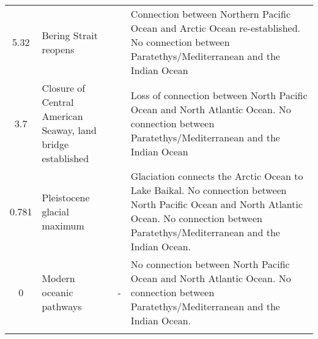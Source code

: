 \begin{longtable}{cp{}cp{}}
5.32 &
Bering Strait reopens &
\cite{gladenkov2002refined} &
Connection between Northern Pacific Ocean and Arctic Ocean re-established. No connection between Paratethys/Mediterranean and the Indian Ocean\\
3.7 &
Closure of Central American Seaway, land bridge established &
\cite{duque1990neogene} &
Loss of connection between North Pacific Ocean and North Atlantic Ocean. No connection between  Paratethys/Mediterranean and the Indian Ocean \\
0.781 &
Pleistocene glacial maximum &
\cite{ehlers2007extent} &
Glaciation connects the Arctic Ocean to Lake Baikal. No connection between North Pacific Ocean and North Atlantic Ocean. No connection between Paratethys/Mediterranean and the Indian Ocean. \\
0 &
Modern oceanic pathways &
- &
No connection between North Pacific Ocean and North Atlantic Ocean. No connection between  Paratethys/Mediterranean and the Indian Ocean.\\
\hline

\label{table-pathways}
\end{longtable}